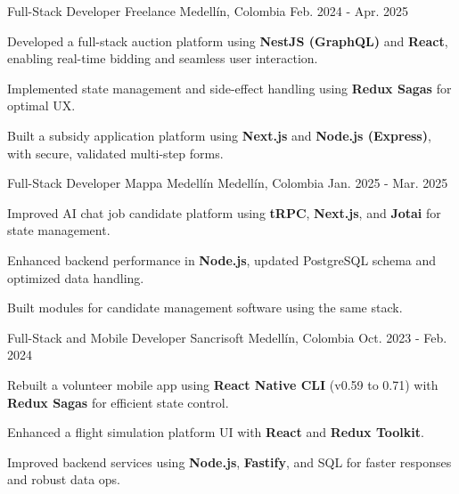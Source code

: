 \newcommand{\quotes}[1]{``#1''}

\begin{cventries}

\cventry
{Full-Stack Developer} %
{Freelance} %
{Medellín, Colombia} %
{Feb. 2024 - Apr. 2025} %
{
  \begin{cvitems}
    \item {Developed a full-stack auction platform using \textbf{NestJS (GraphQL)} and \textbf{React}, enabling real-time bidding and seamless user interaction.}
    \item {Implemented state management and side-effect handling using \textbf{Redux Sagas} for optimal UX.}
    \item {Built a subsidy application platform using \textbf{Next.js} and \textbf{Node.js (Express)}, with secure, validated multi-step forms.}
  \end{cvitems}
}

\cventry
{Full-Stack Developer} %
{Mappa Medellín} %
{Medellín, Colombia} %
{Jan. 2025 - Mar. 2025} %
{
  \begin{cvitems}
    \item {Improved AI chat job candidate platform using \textbf{tRPC}, \textbf{Next.js}, and \textbf{Jotai} for state management.}
    \item {Enhanced backend performance in \textbf{Node.js}, updated PostgreSQL schema and optimized data handling.}
    \item {Built modules for candidate management software using the same stack.}
  \end{cvitems}
}

\cventry
{Full-Stack and Mobile Developer} %
{Sancrisoft} %
{Medellín, Colombia} %
{Oct. 2023 - Feb. 2024} %
{
  \begin{cvitems}
    \item {Rebuilt a volunteer mobile app using \textbf{React Native CLI} (v0.59 to 0.71) with \textbf{Redux Sagas} for efficient state control.}
    \item {Enhanced a flight simulation platform UI with \textbf{React} and \textbf{Redux Toolkit}.}
    \item {Improved backend services using \textbf{Node.js}, \textbf{Fastify}, and SQL for faster responses and robust data ops.}
  \end{cvitems}
}


\end{cventries}
